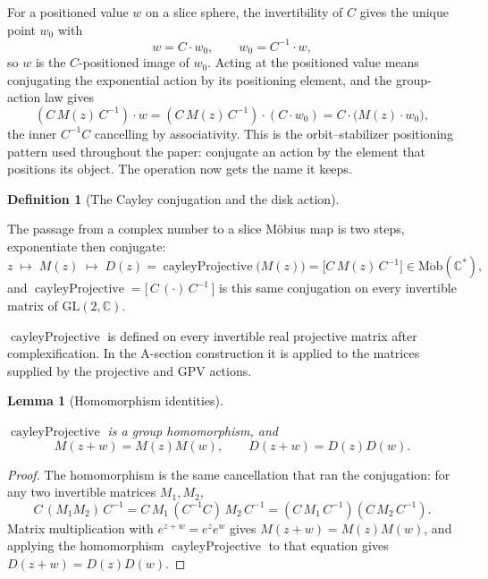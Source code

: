 \documentclass[11pt]{article}
\newcommand{\CC}{\mathbb{C}}
\providecommand{\lean}[1]{}
\providecommand{\uses}[1]{}
\theoremstyle{plain}
\newtheorem{lemma}[theorem]{Lemma}
\theoremstyle{definition}
\newtheorem{definition}[theorem]{Definition}
\theoremstyle{remark}
\begin{document}
For a positioned value $w$ on a slice sphere, the invertibility of $C$
gives the unique point $w_0$
with
\[
  w=C\cdot w_0,\qquad w_0=C^{-1}\cdot w,
\]
so $w$ is the $C$-positioned image of $w_0$.  Acting at the positioned value
means conjugating the exponential action by its positioning element, and the
group-action law gives
\[
  (C\,M(z)\,C^{-1})\cdot w
    =(C\,M(z)\,C^{-1})\cdot(C\cdot w_0)
    =C\cdot\bigl(M(z)\cdot w_0\bigr),
\]
the inner $C^{-1}C$ cancelling by associativity.  This is the
orbit--stabilizer positioning pattern used throughout the paper: conjugate
an action by the element that positions its object.  The operation now gets
the name it keeps.

\begin{definition}[The Cayley conjugation and the disk action]\label{def:cayley-disk}
\lean{GreatCircle.cayleyGL, GreatCircle.cayleyProjective,
GreatCircle.diagonalGL, GreatCircle.expUnit, GreatCircle.diskExpAction}
\uses{def:two-worlds}
The passage from a complex number to a slice M\"obius map is two steps,
exponentiate then conjugate:
\[
  z\;\longmapsto\;M(z)\;\longmapsto\;
  D(z)=\operatorname{cayleyProjective}\bigl(M(z)\bigr)
      =\bigl[C\,M(z)\,C^{-1}\bigr]
      \in\operatorname{M\ddot ob}(\CC^*),
\]
and $\operatorname{cayleyProjective}=\bigl[\,C\,(\cdot)\,C^{-1}\,\bigr]$
is this same conjugation on every invertible matrix of
$\mathrm{GL}(2,\CC)$.
\end{definition}

$\operatorname{cayleyProjective}$ is defined on every invertible real
projective matrix after complexification. In the A-section construction it
is applied to the matrices supplied by the projective and GPV actions.

\begin{lemma}[Homomorphism identities]\label{lem:disk-homomorphism}
\lean{GreatCircle.cayleyProjective_mul, GreatCircle.diagonalGL_mul,
GreatCircle.diagonalGLHom, GreatCircle.expUnit_add,
GreatCircle.diskExpAction_add}
\uses{def:cayley-disk}
$\operatorname{cayleyProjective}$ is a group homomorphism, and
\[
  M(z+w)=M(z)M(w),\qquad D(z+w)=D(z)D(w).
\]
\end{lemma}

\begin{proof}
The homomorphism is the same cancellation that ran the conjugation: for
any two invertible matrices $M_1,M_2$,
\[
  C\,(M_1M_2)\,C^{-1}
    =C\,M_1\,(C^{-1}C)\,M_2\,C^{-1}
    =(C\,M_1\,C^{-1})(C\,M_2\,C^{-1}).
\]
Matrix multiplication with $e^{z+w}=e^ze^w$ gives $M(z+w)=M(z)M(w)$,
and applying the homomorphism $\operatorname{cayleyProjective}$ to that
equation gives $D(z+w)=D(z)D(w)$.
\end{proof}
\end{document}

